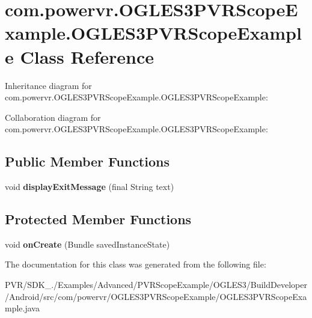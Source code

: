 \hypertarget{classcom_1_1powervr_1_1_o_g_l_e_s3_p_v_r_scope_example_1_1_o_g_l_e_s3_p_v_r_scope_example}{\section{com.\+powervr.\+O\+G\+L\+E\+S3\+P\+V\+R\+Scope\+Example.\+O\+G\+L\+E\+S3\+P\+V\+R\+Scope\+Example Class Reference}
\label{classcom_1_1powervr_1_1_o_g_l_e_s3_p_v_r_scope_example_1_1_o_g_l_e_s3_p_v_r_scope_example}
}


Inheritance diagram for com.\+powervr.\+O\+G\+L\+E\+S3\+P\+V\+R\+Scope\+Example.\+O\+G\+L\+E\+S3\+P\+V\+R\+Scope\+Example\+:


Collaboration diagram for com.\+powervr.\+O\+G\+L\+E\+S3\+P\+V\+R\+Scope\+Example.\+O\+G\+L\+E\+S3\+P\+V\+R\+Scope\+Example\+:
\subsection*{Public Member Functions}
\begin{DoxyCompactItemize}
\item 
\hypertarget{classcom_1_1powervr_1_1_o_g_l_e_s3_p_v_r_scope_example_1_1_o_g_l_e_s3_p_v_r_scope_example_a28cfd4df05456c4d185a013f4c7ee7d4}{void {\bfseries display\+Exit\+Message} (final String text)}\label{classcom_1_1powervr_1_1_o_g_l_e_s3_p_v_r_scope_example_1_1_o_g_l_e_s3_p_v_r_scope_example_a28cfd4df05456c4d185a013f4c7ee7d4}

\end{DoxyCompactItemize}
\subsection*{Protected Member Functions}
\begin{DoxyCompactItemize}
\item 
\hypertarget{classcom_1_1powervr_1_1_o_g_l_e_s3_p_v_r_scope_example_1_1_o_g_l_e_s3_p_v_r_scope_example_ae9dc3fd2a79f88ed99b59d7f13b0913f}{void {\bfseries on\+Create} (Bundle saved\+Instance\+State)}\label{classcom_1_1powervr_1_1_o_g_l_e_s3_p_v_r_scope_example_1_1_o_g_l_e_s3_p_v_r_scope_example_ae9dc3fd2a79f88ed99b59d7f13b0913f}

\end{DoxyCompactItemize}


The documentation for this class was generated from the following file\+:\begin{DoxyCompactItemize}
\item 
P\+V\+R/\+S\+D\+K\+\_./\+Examples/\+Advanced/\+P\+V\+R\+Scope\+Example/\+O\+G\+L\+E\+S3/\+Build\+Developer/\+Android/src/com/powervr/\+O\+G\+L\+E\+S3\+P\+V\+R\+Scope\+Example/O\+G\+L\+E\+S3\+P\+V\+R\+Scope\+Example.\+java\end{DoxyCompactItemize}
